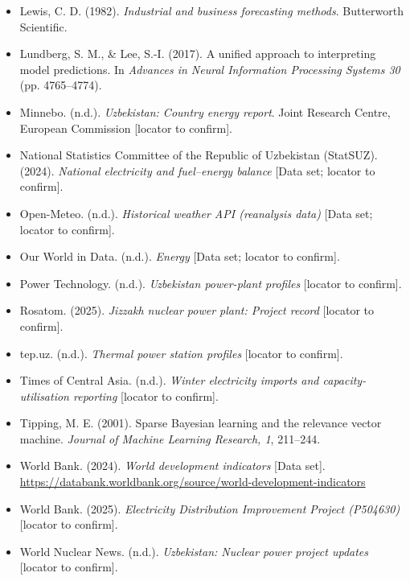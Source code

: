 \documentclass[10pt,twocolumn]{article}
\begin{document}
\begin{itemize}[leftmargin=1.2em,itemsep=1pt,topsep=2pt]
\item Lewis, C. D. (1982). \textit{Industrial and business forecasting methods}. Butterworth Scientific.

\item Lundberg, S. M., \& Lee, S.-I. (2017). A unified approach to interpreting model predictions. In \textit{Advances in Neural Information Processing Systems 30} (pp. 4765--4774).

\item Minnebo. (n.d.). \textit{Uzbekistan: Country energy report}. Joint Research Centre, European Commission [locator to confirm].

\item National Statistics Committee of the Republic of Uzbekistan (StatSUZ). (2024). \textit{National electricity and fuel--energy balance} [Data set; locator to confirm].

\item Open-Meteo. (n.d.). \textit{Historical weather API (reanalysis data)} [Data set; locator to confirm].

\item Our World in Data. (n.d.). \textit{Energy} [Data set; locator to confirm].

\item Power Technology. (n.d.). \textit{Uzbekistan power-plant profiles} [locator to confirm].

\item Rosatom. (2025). \textit{Jizzakh nuclear power plant: Project record} [locator to confirm].

\item tep.uz. (n.d.). \textit{Thermal power station profiles} [locator to confirm].

\item Times of Central Asia. (n.d.). \textit{Winter electricity imports and capacity-utilisation reporting} [locator to confirm].

\item Tipping, M. E. (2001). Sparse Bayesian learning and the relevance vector machine. \textit{Journal of Machine Learning Research, 1}, 211--244.

\item World Bank. (2024). \textit{World development indicators} [Data set]. \url{https://databank.worldbank.org/source/world-development-indicators}

\item World Bank. (2025). \textit{Electricity Distribution Improvement Project (P504630)} [locator to confirm].

\item World Nuclear News. (n.d.). \textit{Uzbekistan: Nuclear power project updates} [locator to confirm].

\end{itemize}
\end{document}

